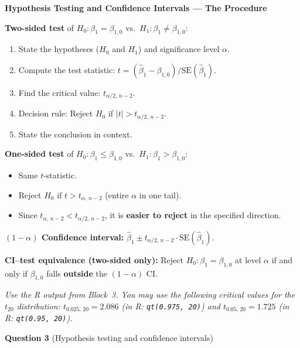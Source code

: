 \documentclass[11pt,a4paper]{article}
\begin{document}
\begin{bookexample}
\textbf{\color{blockcolor}Hypothesis Testing and Confidence Intervals --- The Procedure}

\smallskip
\textbf{Two-sided test} of $H_0\colon \beta_1 = \beta_{1,0}$ vs.\ $H_1\colon \beta_1 \ne \beta_{1,0}$:
\begin{enumerate}[leftmargin=2em,itemsep=2pt]
  \item State the hypotheses ($H_0$ and $H_1$) and significance level $\alpha$.
  \item Compute the test statistic: $t = (\hat{\beta}_1 - \beta_{1,0})/\text{SE}(\hat{\beta}_1)$.
  \item Find the critical value: $t_{\alpha/2,\, n-2}$.
  \item Decision rule: Reject $H_0$ if $|t| > t_{\alpha/2,\, n-2}$.
  \item State the conclusion in context.
\end{enumerate}

\smallskip
\textbf{One-sided test} of $H_0\colon \beta_1 \le \beta_{1,0}$ vs.\ $H_1\colon \beta_1 > \beta_{1,0}$:
\begin{itemize}[leftmargin=1.5em,itemsep=2pt]
  \item Same $t$-statistic.
  \item Reject $H_0$ if $t > t_{\alpha,\, n-2}$ (entire $\alpha$ in one tail).
  \item Since $t_{\alpha,\, n-2} < t_{\alpha/2,\, n-2}$, it is \textbf{easier to reject} in the specified direction.
\end{itemize}

\smallskip
\textbf{$(1-\alpha)$ Confidence interval:}
$\hat{\beta}_1 \pm t_{\alpha/2,\, n-2} \cdot \text{SE}(\hat{\beta}_1)$.

\smallskip
\textbf{CI--test equivalence (two-sided only):} Reject $H_0\colon \beta_1 = \beta_{1,0}$ at level $\alpha$ if and only if $\beta_{1,0}$ falls \textbf{outside} the $(1-\alpha)$ CI.
\end{bookexample}

\medskip
\textit{Use the R output from Block~3. You may use the following critical values for the $t_{20}$ distribution: $t_{0.025,\, 20} = 2.086$ (in R: \texttt{qt(0.975, 20)}) and $t_{0.05,\, 20} = 1.725$ (in R: \texttt{qt(0.95, 20)}).}

\bigskip
\textbf{Question 3} (Hypothesis testing and confidence intervals)
\end{document}
